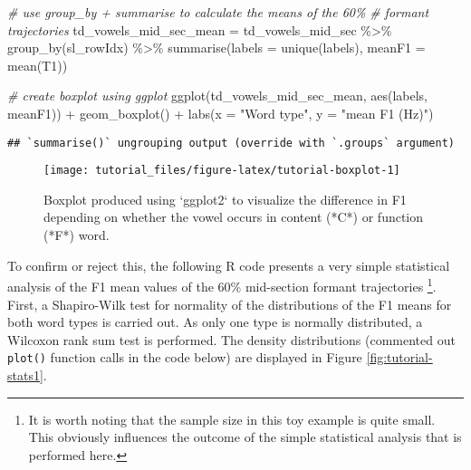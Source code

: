 \documentclass[
]{book}
\newenvironment{Shaded}{\begin{snugshade}}{\end{snugshade}}
\newcommand{\AttributeTok}[1]{\textcolor[rgb]{0.77,0.63,0.00}{#1}}
\newcommand{\CommentTok}[1]{\textcolor[rgb]{0.56,0.35,0.01}{\textit{#1}}}
\newcommand{\FunctionTok}[1]{\textcolor[rgb]{0.00,0.00,0.00}{#1}}
\newcommand{\NormalTok}[1]{#1}
\newcommand{\OtherTok}[1]{\textcolor[rgb]{0.56,0.35,0.01}{#1}}
\newcommand{\SpecialCharTok}[1]{\textcolor[rgb]{0.00,0.00,0.00}{#1}}
\newcommand{\StringTok}[1]{\textcolor[rgb]{0.31,0.60,0.02}{#1}}
\begin{document}
\begin{Shaded}
\begin{Highlighting}[]
\CommentTok{\# use group\_by + summarise to calculate the means of the 60\%}
\CommentTok{\# formant trajectories}
\NormalTok{td\_vowels\_mid\_sec\_mean }\OtherTok{=}\NormalTok{ td\_vowels\_mid\_sec }\SpecialCharTok{\%\textgreater{}\%}
  \FunctionTok{group\_by}\NormalTok{(sl\_rowIdx) }\SpecialCharTok{\%\textgreater{}\%}
  \FunctionTok{summarise}\NormalTok{(}\AttributeTok{labels =} \FunctionTok{unique}\NormalTok{(labels), }\AttributeTok{meanF1 =} \FunctionTok{mean}\NormalTok{(T1))}


\CommentTok{\# create boxplot using ggplot}
\FunctionTok{ggplot}\NormalTok{(td\_vowels\_mid\_sec\_mean, }\FunctionTok{aes}\NormalTok{(labels, meanF1)) }\SpecialCharTok{+}
  \FunctionTok{geom\_boxplot}\NormalTok{() }\SpecialCharTok{+}
  \FunctionTok{labs}\NormalTok{(}\AttributeTok{x =} \StringTok{"Word type"}\NormalTok{, }\AttributeTok{y =} \StringTok{"mean F1 (Hz)"}\NormalTok{)}
\end{Highlighting}
\end{Shaded}

\begin{verbatim}
## `summarise()` ungrouping output (override with `.groups` argument)
\end{verbatim}

\begin{figure}

{\centering \texttt{[image: tutorial\_files/figure-latex/tutorial-boxplot-1]} 

}

\caption{Boxplot produced using `ggplot2` to visualize the difference in F1 depending on whether the vowel occurs in content (*C*) or function (*F*) word.}\label{fig:tutorial-boxplot}
\end{figure}

To confirm or reject this, the following R code presents a very simple statistical analysis of the F1 mean values of the 60\% mid-section formant trajectories \footnote{It is worth noting that the sample size in this toy example is quite small. This obviously influences the outcome of the simple statistical analysis that is performed here.}. First, a Shapiro-Wilk test for normality of the distributions of the F1 means for both word types is carried out. As only one type is normally distributed, a Wilcoxon rank sum test is performed. The density distributions (commented out \texttt{plot()} function calls in the code below) are displayed in Figure \ref{fig:tutorial-stats1}.
\end{document}
